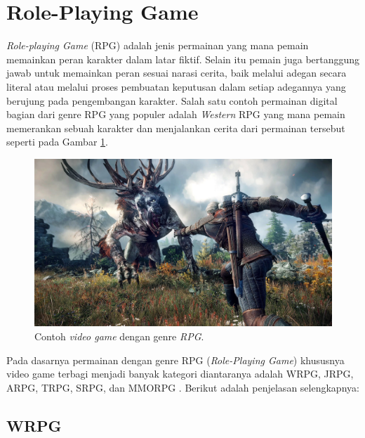 \section{Role-Playing Game}
\label{sec:sec2_rpg}
\vspace{1ex}

\textit{Role-playing Game} (RPG) \citep{Panumate2015} adalah jenis permainan yang mana pemain memainkan peran karakter dalam latar fiktif. Selain itu pemain juga bertanggung jawab untuk memainkan peran sesuai narasi cerita, baik melalui adegan secara literal atau melalui proses pembuatan keputusan dalam setiap adegannya yang berujung pada pengembangan karakter. Salah satu contoh permainan digital bagian dari genre RPG yang populer adalah \textit{Western} RPG yang mana pemain memerankan sebuah karakter dan menjalankan cerita dari permainan tersebut seperti pada Gambar \ref{fig:action_rpg}.
\vspace{2ex}

\begin{figure} [!h] \centering
	\includegraphics[scale=0.20]{img/whitcher.jpg}
	\caption{Contoh \textit{video game} dengan genre \textit{RPG}.}
	\label{fig:action_rpg}
\end{figure}
\vspace{1ex}

Pada dasarnya permainan dengan genre RPG (\textit{Role-Playing Game}) khususnya video game terbagi menjadi banyak kategori diantaranya adalah WRPG, JRPG, ARPG, TRPG, SRPG, dan MMORPG \citep{stenstrom2012}. Berikut adalah penjelasan selengkapnya:
\vspace{1ex}

\subsection{WRPG}
\label{sec:sub_sec2_wrpg}

